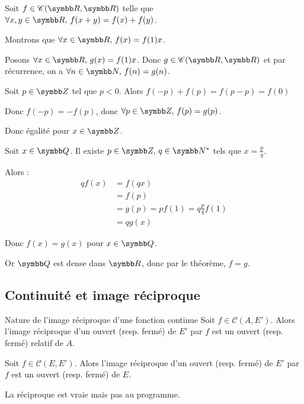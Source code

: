 \begin{exemple}
    Soit $f \in \mathscr C(\R, \R)$ telle que $\forall x, y \in \R, \, f(x + y) = f(x) + f(y)$.

    Montrons que $\forall x \in \R, \, f(x) = f(1) x$.

    Posons $\forall x \in \R, \, g(x) = f(1) x$. Donc $g \in \mathscr C(\R, \R)$ et 
    par récurrence, on a $\forall n \in \N, \, f(n) = g(n)$.

    Soit $p \in \Z$ tel que $p < 0$. Alors $f(-p) + f(p) = f(p - p) = f(0)$

    Donc $f(-p) = - f(p)$, donc $\forall p \in \Z, \, f(p) = g(p)$.

    Donc égalité pour $x \in \Z$. 

    Soit $x \in \Q$. Il existe $p \in \Z, \, q \in \N^*$ tels que $x = \frac p q$.

    Alors : 
    \begin{align*}
        qf(x) & = f(qx) \\
        & = f(p) \\
        & = g(p) = pf(1) = q \frac p q f(1) \\
        & = q g(x)
    \end{align*}

    Donc $f(x) = g(x)$ pour $x \in \Q$.

    Or $\Q$ est dense dans $\R$, donc par le théorème, $f = g$.
\end{exemple}

\subsection{Continuité et image réciproque}

\begin{theoreme}{Nature de l'image réciproque d'une fonction continue}{}
    Soit $f \in \mathscr C(A, E')$. Alors l'image réciproque d'un ouvert (resp. fermé) 
    de $E'$ par $f$ est un ouvert (resp. fermé) relatif de $A$.

    Soit $f \in \mathscr C(E, E')$. Alors l'image réciproque d'un ouvert (resp. fermé)
    de $E'$ par $f$ est un ouvert (resp. fermé) de $E$.
\end{theoreme}

\begin{remarque}
    La réciproque est vraie mais pas au programme.
\end{remarque}

